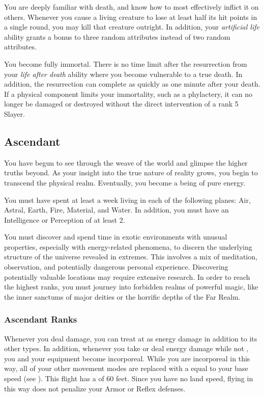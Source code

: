        You are deeply familiar with death, and know how to most effectively inflict it on others.
      Whenever you cause a living creature to lose at least half its hit points in a single round, you may kill that creature outright.
      In addition, your \textit{artificial life} ability grants a bonus to three random attributes instead of two random attributes.

       You become fully immortal. There is no time limit after the resurrection from your \textit{life after death} ability where you become vulnerable to a true death. In addition, the resurrection can complete as quickly as one minute after your death. If a physical component limits your immortality, such as a phylactery, it can no longer be damaged or destroyed without the direct intervention of a rank 5 Slayer.

  \subsection{Ascendant}
    You have begun to see through the weave of the world and glimpse the higher truths beyond.
    As your insight into the true nature of reality grows, you begin to transcend the physical realm.
    Eventually, you become a being of pure energy.

     You must have spent at least a week living in each of the following planes: Air, Astral, Earth, Fire, Material, and Water.
    In addition, you must have an Intelligence or Perception of at least 2.

     You must discover and spend time in exotic environments with unusual properties, especially with energy-related phenomena, to discern the underlying structure of the universe revealed in extremes.
    This involves a mix of meditation, observation, and potentially dangerous personal experience.
    Discovering potentially valuable locations may require extensive research.
    In order to reach the highest ranks, you must journey into forbidden realms of powerful magic, like the inner sanctums of major deities or the horrific depths of the Far Realm.

    \subsubsection{Ascendant Ranks}

       Whenever you deal damage, you can treat at as energy damage in addition to its other types.
      In addition, whenever you take or deal energy damage while not , you and your equipment  become incorporeal.
      While you are incorporeal in this way, all of your other movement modes are replaced with a  equal to your base speed (see ).
      This flight has a  of 60 feet.
      Since you have no land speed, flying in this way does not penalize your Armor or Reflex defenses.

